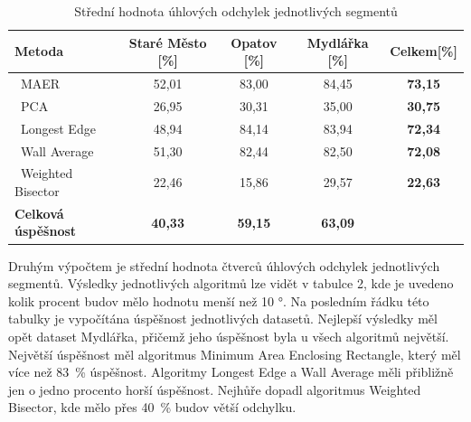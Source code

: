 \documentclass{article}
\begin{document}
\begin{spacing}{1.5}
\begin{table}[htbp]
    \centering
    \begin{tabular}{|l|c|c|c|c|} 
     \hline
         \textbf{Metoda} & \textbf{Staré Město [\%]} & \textbf{Opatov [\%]} & \textbf{Mydlářka [\%]} & \textbf{Celkem[\%]}\\ 
             \hline
             \ MAER & 52,01 & 83,00 & 84,45 & \textbf{73,15} \\
             \hline
             \ PCA & 26,95 & 30,31 & 35,00 & \textbf{30,75} \\
             \hline
             \ Longest Edge & 48,94 & 84,14 & 83,94 & \textbf{72,34 }\\
             \hline
             \ Wall Average &  51,30 & 82,44 & 82,50 & \textbf{72,08} \\
             \hline
             \ Weighted Bisector & 22,46 & 15,86 &  29,57 &  \textbf{22,63} \\
             \hline
             \textbf {Celková úspěšnost}  & \textbf{40,33} & \textbf{59,15} &  \textbf{63,09} &      \\
             \hline
    \end{tabular}
    \caption{Střední hodnota úhlových odchylek jednotlivých segmentů}
\end{table}

Druhým výpočtem je střední hodnota čtverců úhlových odchylek jednotlivých segmentů. Výsledky jednotlivých algoritmů lze vidět v tabulce 2, kde je uvedeno kolik procent budov mělo hodnotu menší než 10 °. Na posledním řádku této tabulky je vypočítána úspěšnost jednotlivých datasetů.  Nejlepší výsledky měl opět dataset Mydlářka, přičemž jeho úspěšnost byla u všech algoritmů největší. Největší úspěšnost měl algoritmus Minimum Area Enclosing Rectangle, který měl více než 83~\% úspěšnost. Algoritmy Longest Edge a Wall Average měli přibližně jen o jedno procento horší úspěšnost. Nejhůře dopadl algoritmus Weighted Bisector, kde mělo přes 40~\% budov větší odchylku. 


\end{spacing}
\end{document}

